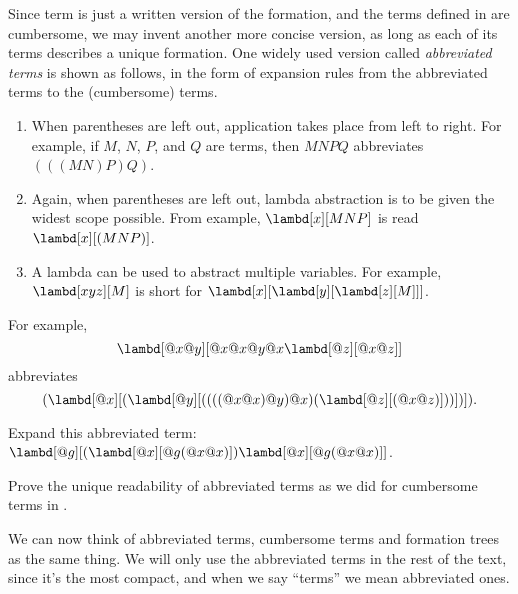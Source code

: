 \documentclass[../../../include/open-logic-section]{subfiles}
\begin{document}

Since term is just a written version of the formation, and the terms
defined in  are cumbersome, we may invent another more concise version, as
long as each of its terms describes a unique formation. One
widely used version called \emph{abbreviated terms} is shown as
follows, in the form of expansion rules from the abbreviated terms to the (cumbersome) terms.

\begin{enumerate}
\item When parentheses are left out, application takes place from left
  to right. For example, if $M$, $N$, $P$, and $Q$ are terms, then
  $MNPQ$ abbreviates $(((MN)P)Q)$.
\item Again, when parentheses are left out, lambda abstraction is to
  be given the widest scope possible. From example, $\lambd[x][MNP]$ is
  read $\lambd[x][(MNP)]$.
\item A lambda can be used to abstract multiple variables. For
  example, $\lambd[xyz][M]$ is short for
  $\lambd[x][\lambd[y][\lambd[z][M]]]$.
\end{enumerate}

For example,
\[
\lambd[@x@y][@x@x@y@x \lambd[@z][@x@z]]
\]
abbreviates
\[
(\lambd[@x][(\lambd[@y][((((@x@x)@y)@x)(\lambd[@z][(@x@z)]))])]).
\]

\begin{prob}
  Expand this abbreviated term: $\lambd[@g][(\lambd[@x][@g (@x @x)]) \lambd[@x][@g (@x @x)]]$.
\end{prob}

\begin{prob}
  Prove the unique readability of abbreviated terms as we did for
  cumbersome terms in .
\end{prob}

We can now think of abbreviated terms, cumbersome terms and
formation trees as the same
thing. We will only use the abbreviated terms in the rest of the
text, since it's the most compact, and when we say ``terms'' we mean
abbreviated ones.
\end{document}
